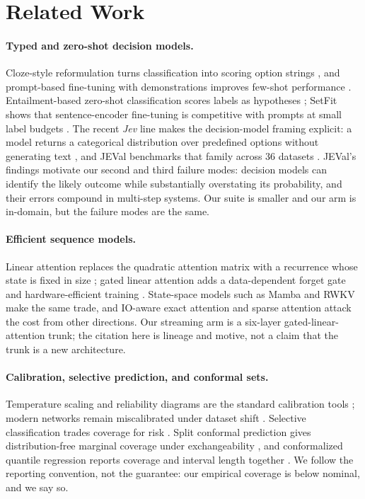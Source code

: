 \section{Related Work}
\label{sec:related}

\paragraph{Typed and zero-shot decision models.}
Cloze-style reformulation turns classification into scoring option strings \cite{schick2021pet}, and prompt-based fine-tuning with demonstrations improves few-shot performance \cite{gao2021lmbff}. Entailment-based zero-shot classification scores labels as hypotheses \cite{yin2019benchmarking}; SetFit shows that sentence-encoder fine-tuning is competitive with prompts at small label budgets \cite{tunstall2022setfit}. The recent \emph{Jev} line makes the decision-model framing explicit: a model returns a categorical distribution over predefined options without generating text \cite{li2026jev}, and JEVal benchmarks that family across 36 datasets \cite{duan2026gdm}. JEVal's findings motivate our second and third failure modes: decision models can identify the likely outcome while substantially overstating its probability, and their errors compound in multi-step systems. Our suite is smaller and our arm is in-domain, but the failure modes are the same.

\paragraph{Efficient sequence models.}
Linear attention replaces the quadratic attention matrix with a recurrence whose state is fixed in size \cite{katharopoulos2020transformers}; gated linear attention adds a data-dependent forget gate and hardware-efficient training \cite{yang2024gla}. State-space models such as Mamba \cite{gu2024mamba} and RWKV \cite{peng2023rwkv} make the same trade, and IO-aware exact attention \cite{dao2022flashattention} and sparse attention \cite{beltagy2020longformer} attack the cost from other directions. Our streaming arm is a six-layer gated-linear-attention trunk; the citation here is lineage and motive, not a claim that the trunk is a new architecture.

\paragraph{Calibration, selective prediction, and conformal sets.}
Temperature scaling and reliability diagrams are the standard calibration tools \cite{guo2017calibration}; modern networks remain miscalibrated under dataset shift \cite{ovadia2019uncertainty}. Selective classification trades coverage for risk \cite{geifman2017selective,geifman2019selectivenet}. Split conformal prediction gives distribution-free marginal coverage under exchangeability \cite{lei2018distribution,angelopoulos2021gentle}, and conformalized quantile regression reports coverage and interval length together \cite{romano2019cqr}. We follow the reporting convention, not the guarantee: our empirical coverage is below nominal, and we say so.

